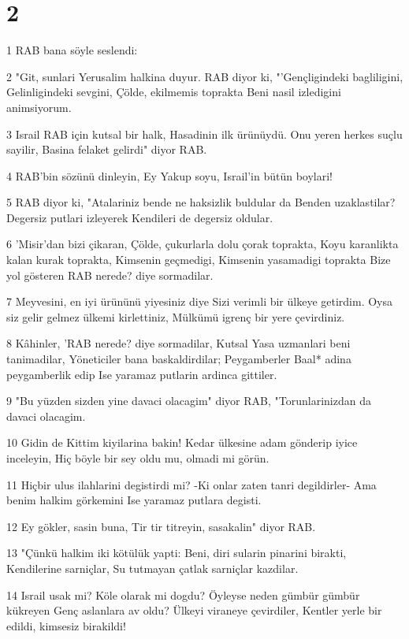 \chapter{2}

\par 1 RAB bana söyle seslendi:
\par 2 "Git, sunlari Yerusalim halkina duyur. RAB diyor ki, "'Gençligindeki bagliligini, Gelinligindeki sevgini, Çölde, ekilmemis toprakta Beni nasil izledigini animsiyorum.
\par 3 Israil RAB için kutsal bir halk, Hasadinin ilk ürünüydü. Onu yeren herkes suçlu sayilir, Basina felaket gelirdi" diyor RAB.
\par 4 RAB'bin sözünü dinleyin, Ey Yakup soyu, Israil'in bütün boylari!
\par 5 RAB diyor ki, "Atalariniz bende ne haksizlik buldular da Benden uzaklastilar? Degersiz putlari izleyerek Kendileri de degersiz oldular.
\par 6 'Misir'dan bizi çikaran, Çölde, çukurlarla dolu çorak toprakta, Koyu karanlikta kalan kurak toprakta, Kimsenin geçmedigi, Kimsenin yasamadigi toprakta Bize yol gösteren RAB nerede? diye sormadilar.
\par 7 Meyvesini, en iyi ürününü yiyesiniz diye Sizi verimli bir ülkeye getirdim. Oysa siz gelir gelmez ülkemi kirlettiniz, Mülkümü igrenç bir yere çevirdiniz.
\par 8 Kâhinler, 'RAB nerede? diye sormadilar, Kutsal Yasa uzmanlari beni tanimadilar, Yöneticiler bana baskaldirdilar; Peygamberler Baal* adina peygamberlik edip Ise yaramaz putlarin ardinca gittiler.
\par 9 "Bu yüzden sizden yine davaci olacagim" diyor RAB, "Torunlarinizdan da davaci olacagim.
\par 10 Gidin de Kittim kiyilarina bakin! Kedar ülkesine adam gönderip iyice inceleyin, Hiç böyle bir sey oldu mu, olmadi mi görün.
\par 11 Hiçbir ulus ilahlarini degistirdi mi? -Ki onlar zaten tanri degildirler- Ama benim halkim görkemini Ise yaramaz putlara degisti.
\par 12 Ey gökler, sasin buna, Tir tir titreyin, sasakalin" diyor RAB.
\par 13 "Çünkü halkim iki kötülük yapti: Beni, diri sularin pinarini birakti, Kendilerine sarniçlar, Su tutmayan çatlak sarniçlar kazdilar.
\par 14 Israil usak mi? Köle olarak mi dogdu? Öyleyse neden gümbür gümbür kükreyen Genç aslanlara av oldu? Ülkeyi viraneye çevirdiler, Kentler yerle bir edildi, kimsesiz birakildi!
